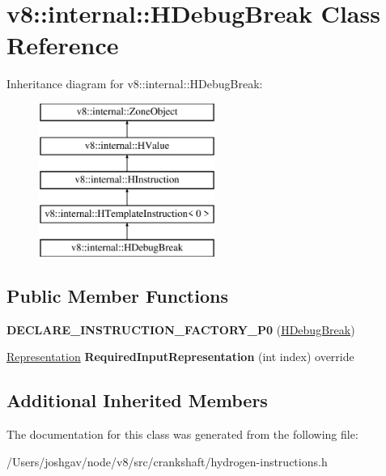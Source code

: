 \hypertarget{classv8_1_1internal_1_1_h_debug_break}{}\section{v8\+:\+:internal\+:\+:H\+Debug\+Break Class Reference}
\label{classv8_1_1internal_1_1_h_debug_break}
Inheritance diagram for v8\+:\+:internal\+:\+:H\+Debug\+Break\+:\begin{figure}[H]
\begin{center}
\leavevmode
\includegraphics[height=5.000000cm]{classv8_1_1internal_1_1_h_debug_break}
\end{center}
\end{figure}
\subsection*{Public Member Functions}
\begin{DoxyCompactItemize}
\item 
{\bfseries D\+E\+C\+L\+A\+R\+E\+\_\+\+I\+N\+S\+T\+R\+U\+C\+T\+I\+O\+N\+\_\+\+F\+A\+C\+T\+O\+R\+Y\+\_\+\+P0} (\hyperlink{classv8_1_1internal_1_1_h_debug_break}{H\+Debug\+Break})\hypertarget{classv8_1_1internal_1_1_h_debug_break_ac9a556b1a95def866f707e0498151713}{}\label{classv8_1_1internal_1_1_h_debug_break_ac9a556b1a95def866f707e0498151713}

\item 
\hyperlink{classv8_1_1internal_1_1_representation}{Representation} {\bfseries Required\+Input\+Representation} (int index) override\hypertarget{classv8_1_1internal_1_1_h_debug_break_a8c38480c44b3ec9dda0f931363b5f9bc}{}\label{classv8_1_1internal_1_1_h_debug_break_a8c38480c44b3ec9dda0f931363b5f9bc}

\end{DoxyCompactItemize}
\subsection*{Additional Inherited Members}


The documentation for this class was generated from the following file\+:\begin{DoxyCompactItemize}
\item 
/\+Users/joshgav/node/v8/src/crankshaft/hydrogen-\/instructions.\+h\end{DoxyCompactItemize}
